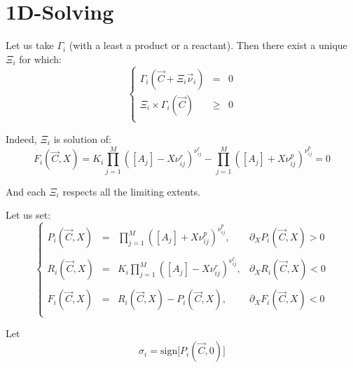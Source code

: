 \documentclass[aps,12pt]{revtex4}
\begin{document}
\section{1D-Solving}

 
Let us take $\Gamma_i$ (with a least a product or a reactant).
Then there exist a unique $\Xi_i$ for which:
\begin{equation}
\left\lbrace
\begin{array}{rcl}
	\Gamma_i(\vec{C} + \Xi_i \vec{\nu}_i ) & = & 0\\
	 \Xi_i \times \Gamma_i(\vec{C}) &\geq  &0\\
\end{array}
\right.
\end{equation}
 
Indeed, $\Xi_i$ is solution of:
\begin{equation}
	 F_i(\vec{C},X) =  K_i \prod_{j=1}^{M} \left([A_j] - X \nu^r_{ij}\right)^{\nu^r_{ij}} 
	- \prod_{j=1}^{M} \left([A_j] + X \nu^p_{ij} \right)^{\nu^p_{ij}} = 0
\end{equation} 

And each $\Xi_i$ respects all the limiting extents.


Let us set:
\begin{equation}
\left\lbrace
\begin{array}{rcll}
	P_i(\vec{C},X) & = & \displaystyle \prod_{j=1}^{M} \left([A_j] + X \nu^p_{ij} \right)^{\nu^p_{ij}}, & \partial_X P_i(\vec{C},X) > 0 \\
	\\
	R_i(\vec{C},X) & = & \displaystyle K_i \prod_{j=1}^{M} \left([A_j] - X \nu^r_{ij}\right)^{\nu^r_{ij}}, & \partial_X R_i(\vec{C},X) < 0 \\
	\\
	 F_i(\vec{C},X) & = & R_i(\vec{C},X)  - P_i(\vec{C},X), & \partial_X F_i(\vec{C},X) < 0\\
\end{array}
\right.
\end{equation}

Let
\begin{equation}
	\sigma_i = \mathrm{sign}\lbrack P_i(\vec{C},0) \rbrack
\end{equation}
\end{document}
